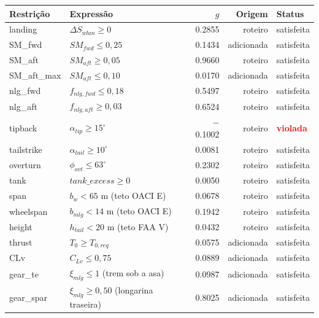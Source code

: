 \begin{tabular}{llrrl}
\toprule
Restrição & Expressão & $g$ & Origem & Status \\
\midrule
landing & $\Delta S_{wlan} \geq 0$ & 0.2855 & roteiro & satisfeita \\
SM\_fwd & $SM_{fwd} \leq 0{,}25$ & 0.1434 & adicionada & satisfeita \\
SM\_aft & $SM_{aft} \geq 0{,}05$ & 0.9660 & roteiro & satisfeita \\
SM\_aft\_max & $SM_{aft} \leq 0{,}10$ & 0.0170 & adicionada & satisfeita \\
nlg\_fwd & $f_{nlg,fwd} \leq 0{,}18$ & 0.5497 & roteiro & satisfeita \\
nlg\_aft & $f_{nlg,aft} \geq 0{,}03$ & 0.6524 & roteiro & satisfeita \\
tipback & $\alpha_{tip} \geq 15^\circ$ & $-$0.1002 & roteiro & \textcolor{red}{\textbf{violada}} \\
tailstrike & $\alpha_{tail} \geq 10^\circ$ & 0.0081 & roteiro & satisfeita \\
overturn & $\phi_{ovt} \leq 63^\circ$ & 0.2302 & roteiro & satisfeita \\
tank & $tank\_excess \geq 0$ & 0.0050 & roteiro & satisfeita \\
span & $b_w < 65$ m (teto OACI E) & 0.0678 & roteiro & satisfeita \\
wheelspan & $b_{mlg} < 14$ m (teto OACI E) & 0.1942 & roteiro & satisfeita \\
height & $h_{tail} < 20$ m (teto FAA V) & 0.0432 & roteiro & satisfeita \\
thrust & $T_0 \geq T_{0,req}$ & 0.0575 & adicionada & satisfeita \\
CLv & $C_{Lv} \leq 0{,}75$ & 0.0889 & adicionada & satisfeita \\
gear\_te & $\xi_{mlg} \leq 1$ (trem sob a asa) & 0.0987 & adicionada & satisfeita \\
gear\_spar & $\xi_{mlg} \geq 0{,}50$ (longarina traseira) & 0.8025 & adicionada & satisfeita \\
\bottomrule
\end{tabular}